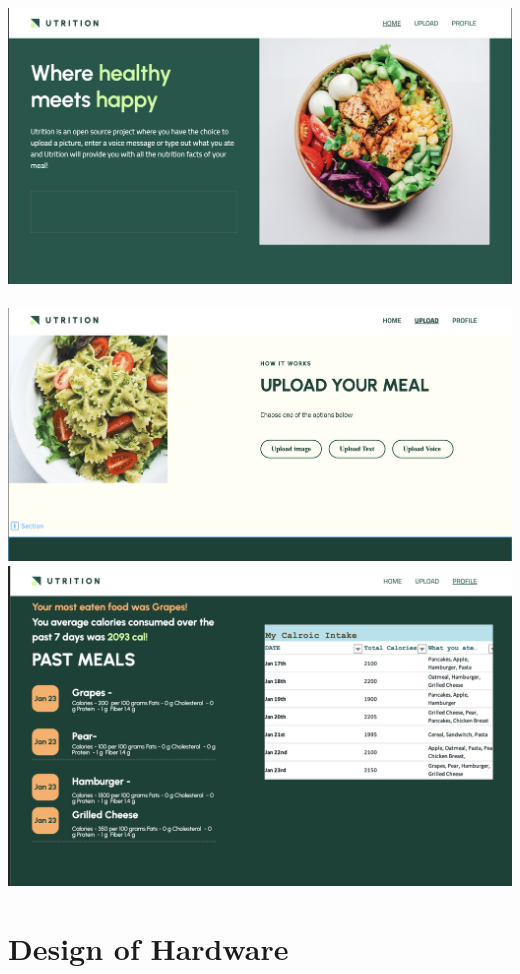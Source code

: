 \documentclass[12pt, titlepage]{article}
\begin{document}
\includegraphics[scale=0.55]{home.jpg}\\ \\
\includegraphics[scale=0.55]{upload.jpg}\\
\includegraphics[scale=0.75]{profile.jpg}

\section{Design of Hardware}
\end{document}
